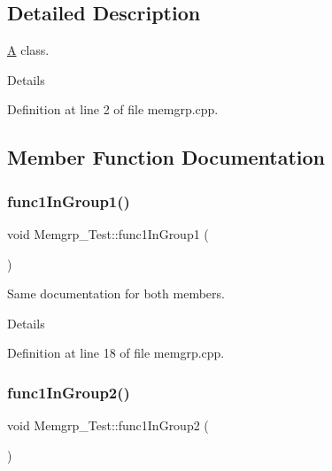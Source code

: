 \subsection{Detailed Description}
\mbox{\hyperlink{class_a}{A}} class. 

Details 

Definition at line 2 of file memgrp.\+cpp.



\subsection{Member Function Documentation}
\mbox{\label{class_memgrp___test_a5052066c03efb51395b5334da4255cd2}} 
\subsubsection{\texorpdfstring{func1InGroup1()}{func1InGroup1()}}
{\footnotesize\ttfamily void Memgrp\+\_\+\+Test\+::func1\+In\+Group1 (\begin{DoxyParamCaption}{ }\end{DoxyParamCaption})}



Same documentation for both members. 

Details 

Definition at line 18 of file memgrp.\+cpp.


\begin{DoxyCode}{0}

\end{DoxyCode}
\mbox{\label{class_memgrp___test_ab0e6553ddc36ac3cef0ac229c5dd4cdb}} 
\subsubsection{\texorpdfstring{func1InGroup2()}{func1InGroup2()}}
{\footnotesize\ttfamily void Memgrp\+\_\+\+Test\+::func1\+In\+Group2 (\begin{DoxyParamCaption}{ }\end{DoxyParamCaption})}




